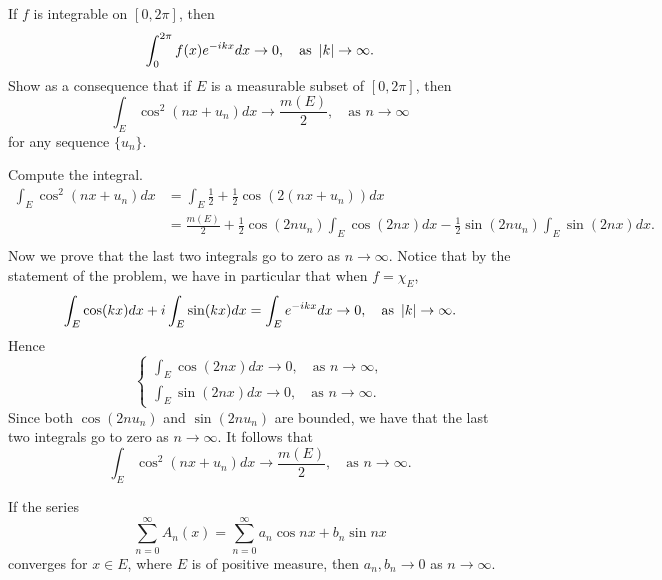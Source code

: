 \begin{problem}
    If $f$ is integrable on $[0,2\pi]$, then 
    \begin{equation*}
        \int_0^{2\pi} f(x)e^{-ikx}dx \to 0, \quad \text{as } \left\lvert {k} \right\rvert\to\infty.
    \end{equation*}
    Show as a consequence that if $E$ is a 
    measurable subset of $[0,2\pi]$, then 
    \begin{equation*}
        \int_E \cos^2(nx + u_n)dx \to \frac{m(E)}{2}, \quad \text{as } n\to\infty
    \end{equation*}
    for any sequence $\{u_n\}$.
\end{problem}
\begin{pf}
    Compute the integral. 
    \begin{equation*}
        \begin{split}
            \int_E \cos^2(nx + u_n)dx &= \int_E \frac{1}{2} + \frac{1}{2}\cos(2(nx + u_n))dx \\
            &= \frac{m(E)}{2} + \frac{1}{2}\cos(2nu_n)\int_E \cos(2nx)dx - \frac{1}{2}\sin(2nu_n)\int_E\sin(2nx)dx. \\
        \end{split}
    \end{equation*}
    Now we prove that the last two integrals go to zero as $n\to\infty$. Notice that 
    by the statement of the problem, we have in particular that when $f = \chi_E$, 
    \begin{equation*}
        \int_E \cos(kx)dx + i\int_E \sin(kx)dx = \int_E e^{-ikx}dx \to 0, \quad \text{as } \left\lvert {k} \right\rvert\to\infty.
    \end{equation*}
    Hence 
    \begin{equation*}
        \begin{cases*}
            \int_E \cos(2nx)dx \to 0, \quad \text{as } n\to\infty, \\
            \int_E \sin(2nx)dx \to 0, \quad \text{as } n\to\infty.
        \end{cases*}
    \end{equation*}
    Since both $\cos(2nu_n)$ and $\sin(2nu_n)$ are bounded, we have that 
    the last two integrals go to zero as $n\to\infty$. It follows that 
    \begin{equation*}
        \int_E \cos^2(nx + u_n)dx \to \frac{m(E)}{2}, \quad \text{as } n\to\infty.
    \end{equation*}
\end{pf}

\begin{problem}
    If the series 
    \begin{equation*}
        \sum_{n=0}^{\infty} A_n(x) = \sum_{n=0}^{\infty} a_n\cos nx + b_n\sin nx
    \end{equation*}
    converges for $x\in E$, where $E$ is of positive measure, then $a_n,b_n\to 0$ as $n\to\infty$.
\end{problem}
\begin{pf}
    
\end{pf}